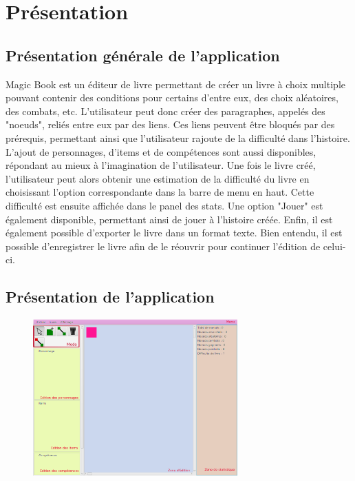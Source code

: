 \chapter{Présentation}

	\section{Présentation générale de l'application}

        Magic Book est un éditeur de livre permettant de créer un livre à choix multiple pouvant contenir des conditions pour certains d'entre eux, des choix aléatoires, des combats, etc. L'utilisateur peut donc créer des paragraphes, appelés des "noeuds", reliés entre eux par des liens. Ces liens peuvent être bloqués par des prérequis, permettant ainsi que l'utilisateur rajoute de la difficulté dans l'histoire. L'ajout de personnages, d'items et de compétences sont aussi disponibles, répondant au mieux à l'imagination de l'utilisateur. Une fois le livre créé, l'utilisateur peut alors obtenir une estimation de la difficulté du livre en choisissant l'option correspondante dans la barre de menu en haut. Cette difficulté est ensuite affichée dans le panel des stats. Une option "Jouer" est également disponible, permettant ainsi de jouer à l'histoire créée. Enfin, il est également possible d'exporter le livre dans un format texte. Bien entendu, il est possible d'enregistrer le livre afin de le réouvrir pour continuer l'édition de celui-ci.

	\section{Présentation de l'application}

		\begin{figure}[H]
			\centering\includegraphics[width=0.7\textwidth, keepaspectratio]{img/magicBook.png}
		\end{figure}

